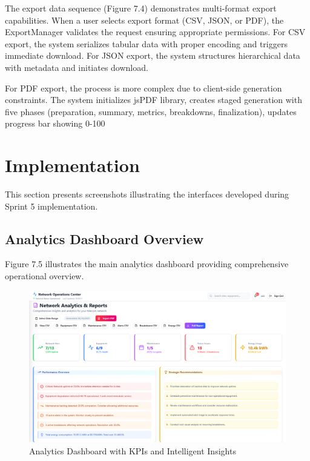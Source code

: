 The export data sequence (Figure 7.4) demonstrates multi-format export capabilities. When a user selects export format (CSV, JSON, or PDF), the ExportManager validates the request ensuring appropriate permissions. For CSV export, the system serializes tabular data with proper encoding and triggers immediate download. For JSON export, the system structures hierarchical data with metadata and initiates download.

For PDF export, the process is more complex due to client-side generation constraints. The system initializes jsPDF library, creates staged generation with five phases (preparation, summary, metrics, breakdowns, finalization), updates progress bar showing 0-100%

\section{Implementation}

This section presents screenshots illustrating the interfaces developed during Sprint 5 implementation.

\subsection{Analytics Dashboard Overview}

Figure 7.5 illustrates the main analytics dashboard providing comprehensive operational overview.

\begin{figure}[H]
    \centering
    \includegraphics[width=0.9\linewidth]{img/chap_07/screenshot_analytics_dashboard.png}
    \caption{Analytics Dashboard with KPIs and Intelligent Insights}
    \label{fig:analytics_dashboard}
\end{figure}

